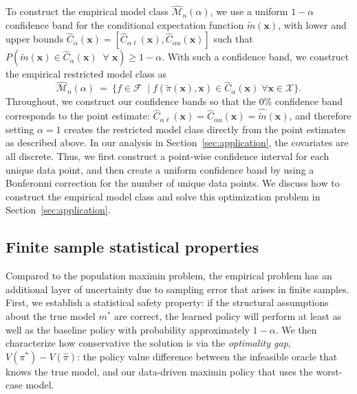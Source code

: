 \documentclass[12pt]{article}
\theoremstyle{definition}
\newcommand{\bx}{\bm x}
\newcommand{\<}{\langle}
\renewcommand{\>}{\rangle}
\newcommand\mcal[1]{\ensuremath{\mathcal{#1}}}
\begin{document}
To construct the empirical model class $\widehat{\mcal{M}}_n(\alpha)$,
we use a uniform $1-\alpha$ confidence band for the conditional
expectation function $\tilde{m}(\bx)$, with lower and upper bounds
$\widehat{C}_\alpha(\bx) = [\widehat{C}_{\alpha \ell} (\bx),
\widehat{C}_{\alpha u}(\bx)]$ such that
$  
P\left(\tilde{m}(\bx) \in \widehat{C}_\alpha(\bx) \;\; \forall \; \bx\right) \geq 1 - \alpha.
$
With such a confidence band, we construct the empirical restricted model class as
\[
  \widehat{\mcal{M}}_n(\alpha) \ = \ \{f \in \mcal{F} \; \mid f(\tilde{\pi}(\bx), \bx)  \in \widehat{C}_\alpha(\bx) \; \forall \bx \in \mathcal{X}\}.
\]
Throughout, we construct our confidence bands so that the 0\% confidence band corresponds to the point estimate: $\widehat{C}_{\alpha \ell}(\bx) = \widehat{C}_{\alpha u}(\bx) = \hat{\tilde{m}}(\bx)$, and therefore setting $\alpha = 1$ creates the restricted model class directly from the point estimates as described above.
%
In our analysis in Section~\ref{sec:application}, the covariates are
all discrete.  Thus, we first construct a point-wise confidence
interval for each unique data point, and then create a uniform
confidence band by using a Bonferonni correction for the number of
unique data points.
We discuss how to construct the empirical model class and solve this
optimization problem in Section~\ref{sec:application}.


\subsection{Finite sample statistical properties}
\label{sec:stats_theory}
Compared to the population maximin problem, the empirical problem has
an additional layer of uncertainty due to sampling error that arises in finite samples.
First, we establish a statistical safety property: if the
structural assumptions about the true model $m^\ast$ are correct,
the learned policy will perform at least as well as the baseline policy
with probability approximately $1 - \alpha$.
We then characterize how conservative the solution is via the {\it
  optimality gap}, $V(\pi^\ast) - V(\hat{\pi})$: the policy value
difference between the infeasible oracle that knows the true model,
and our data-driven maximin policy that uses the worst-case model.
\end{document}
